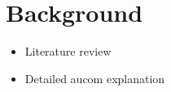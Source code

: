 \chapter{Background}
\label{chap:background}

\begin{itemize}
\item Literature review
\item Detailed aucom explanation
\end{itemize}


